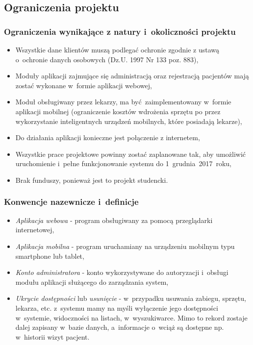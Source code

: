 \subsection{Ograniczenia projektu}

\subsubsection{Ograniczenia wynikające z natury i~okoliczności projektu}

\begin{itemize}
	\item Wszystkie dane klientów muszą podlegać ochronie zgodnie z ustawą o~ochronie danych osobowych (Dz.U. 1997 Nr 133 poz. 883),
	\item Moduły aplikacji zajmujące się administracją oraz rejestracją pacjentów mają zostać wykonane w~formie aplikacji webowej,
	\item Moduł obsługiwany przez lekarzy, ma być zaimplementowany w~formie aplikacji mobilnej (ograniczenie kosztów wdrożenia sprzętu po przez wykorzystanie inteligentnych urządzeń mobilnych, które posiadają lekarze),
	\item Do działania aplikacji konieczne jest połączenie z internetem,
	\item Wszystkie prace projektowe powinny zostać zaplanowane tak, aby umożliwić uruchomienie i~pełne funkcjonowanie systemu do 1~grudnia~2017~roku,
	\item Brak funduszy, ponieważ jest to projekt studencki.
\end{itemize}

\subsubsection{Konwencje nazewnicze i~definicje}
\begin{itemize}
	\item \textit{Aplikacja webowa} - program obsługiwany za pomocą przeglądarki internetowej,
	\item \textit{Aplikacja mobilna} - program uruchamiany na urządzeniu mobilnym typu smartphone lub tablet,
	\item \textit{Konto administratora} - konto wykorzystywane do autoryzacji i~obsługi modułu aplikacji służącego do zarządzania system,
	\item \textit{Ukrycie dostępności} lub \textit{usunięcie} - w~przypadku usuwania zabiegu, sprzętu, lekarza, etc. z~systemu mamy na myśli wyłączenie jego dostępności w~systemie, widoczności na listach, w~wyszukiwarce. Mimo to rekord zostaje dalej zapisany w~bazie danych, a~informacje o~wciąż są dostępne np. w~historii wizyt pacjent.
\end{itemize}

